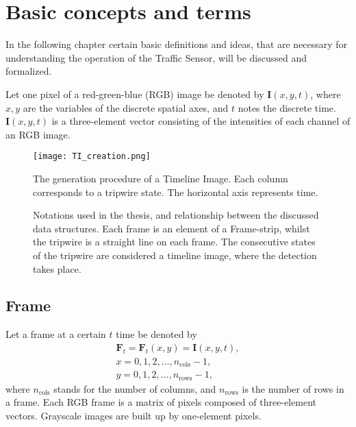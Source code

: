 \setcounter{chapter}{0}%
\renewcommand{\thechapter}{\arabic{chapter}}%
\chapter{Basic concepts and terms}\label{chap:Concepts}
In the following chapter certain basic definitions and ideas, that are necessary for understanding the operation of the Traffic Sensor, will be discussed and formalized.

Let one pixel of a red-green-blue (RGB) image be denoted by $\boldsymbol{I}(x,y,t)$, where $x, y$ are the variables of the discrete spatial axes, and $t$ notes the discrete time.
$\boldsymbol{I}(x,y,t)$ is a three-element vector consisting of the intensities of each channel of an RGB image.
\begin{figure}[bh]
	\centering
	\texttt{[image: TI\_creation.png]}
	\caption[Generation procedure of a Timeline Image]{The generation procedure of a Timeline Image. Each column corresponds to a tripwire state. The horizontal axis represents time.\label{fig:TI_creation}}
\end{figure}
\begin{figure}[h!]
	\centering
	\scalebox{.7}{}
	\caption[Visualization of the notations used in the thesis]{Notations used in the thesis, and relationship between the discussed data structures. Each frame is an element of a Frame-strip, whilst the tripwire is a straight line on each frame. The consecutive states of the tripwire are considered a timeline image, where the detection takes place.	\label{fig:notations}}
\end{figure}
\section{Frame}
Let a frame at a certain $t$ time be denoted by
\begin{gather*}
	\boldsymbol{F}_t=\boldsymbol{F}_t(x,y)=\boldsymbol{I}(x,y,t),\\
	x=0,1,2,\dotsc,n_{\text{cols}}-1,\\
	y=0,1,2,\dotsc,n_{\text{rows}}-1,
\end{gather*}
where $n_{\text{cols}}$ stands for the number of columns, and $n_{\text{rows}}$ is the number of rows in a frame.
Each RGB frame is a matrix of pixels composed of three-element vectors.
Grayscale images are built up by one-element pixels.


